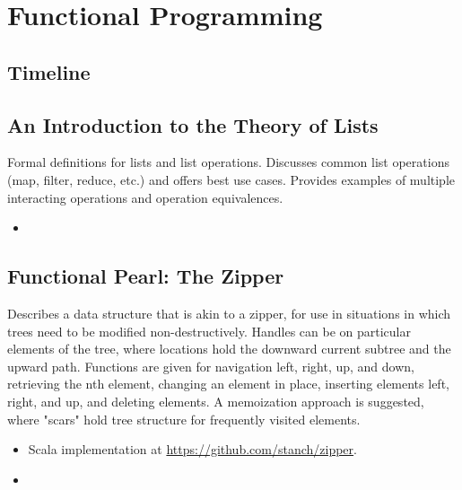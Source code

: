 \chapter {Functional Programming}

\section{Timeline}


\section{An Introduction to the Theory of Lists \cite{bird1987introduction}}
Formal definitions for lists and list operations. Discusses common list
operations (map, filter, reduce, etc.) and offers best use cases. Provides
examples of multiple interacting operations and operation equivalences.
\begin{itemize}
    \item {}
\end{itemize}

\section{Functional Pearl: The Zipper \cite{huet1997zipper}}
Describes a data structure that is akin to a zipper, for use in situations in
which trees need to be modified non-destructively. Handles can be on particular
elements of the tree, where locations hold the downward current subtree and the
upward path. Functions are given for navigation left, right, up, and down,
retrieving the nth element, changing an element in place, inserting elements
left, right, and up, and deleting elements. A memoization approach is suggested,
where "scars" hold tree structure for frequently visited elements.
\begin{itemize}
    \item Scala implementation at \href{https://github.com/stanch/zipper}{https://github.com/stanch/zipper}.
    \item {}
\end{itemize}

